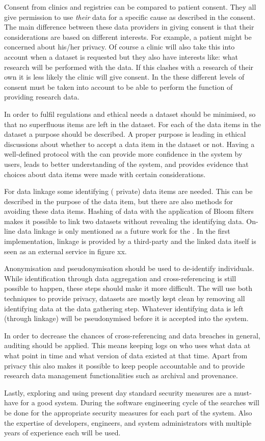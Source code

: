 Consent from clinics and registries can be compared to patient consent.
They all give permission to use \emph{their} data for a specific cause as described in the consent.
The main difference between these data providers in giving consent is that their considerations are based on different interests.
For example, a patient might be concerned about his/her privacy.
Of course a clinic will also take this into account when a dataset is requested but they also have interests like: what research will be performed with the data.
If this clashes with a research of their own it is less likely the clinic will give consent.
In the \ivfsystem{} these different levels of consent must be taken into account  to be able to perform the function of providing research data.

In order to fulfil regulations and ethical needs a dataset should be minimised, so that no superfluous items are left in the dataset.
For each of the data items in the dataset a purpose should be described. 
A proper purpose is leading in ethical discussions about whether to accept a data item in the dataset or not.
Having a well-defined protocol with the \ivfsystem{} can provide more confidence in the system by users, leads to better understanding of the system, and provides evidence that choices about data items were made with certain considerations.

For data linkage some identifying (\ie{} private) data items are needed.
This can be described in the purpose of the data item, but there are also methods for avoiding these data items.
Hashing of data with the application of Bloom filters \cite{s22schnell2009} makes it possible to link two datasets without revealing the identifying data.
On-line data linkage is only mentioned as a future work for the \ivfsystem{}.
In the first implementation, linkage is provided by a third-party and the linked data itself is seen as an external service in figure xx.

Anonymisation and pseudonymisation should be used to de-identify individuals.
While identification through data aggregation and cross-referencing is still possible to happen, these steps should make it more difficult.
The \ivfsystem{} will use both techniques to provide privacy, datasets are mostly kept clean by removing all identifying data at the data gathering step.
Whatever identifying data is left (through linkage) will be pseudonymised before it is accepted into the system.

In order to decrease the chances of cross-referencing and data breaches in general, auditing should be applied.
This means keeping logs on who uses what data at what point in time and what version of data existed at that time.
Apart from privacy this also makes it possible to keep people accountable and to provide research data management functionalities such as archival and provenance.

Lastly, exploring and using present day standard security measures are a must-have for a good system.
During the software engineering cycle of the \ivfsystem{} searches will be done for the appropriate security measures for each part of the system.
Also the expertise of developers, engineers, and system administrators with multiple years of experience each will be used.